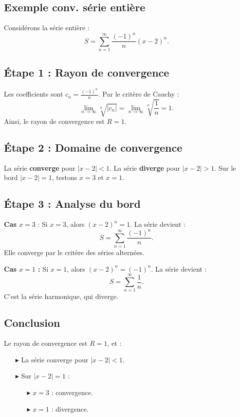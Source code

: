 \documentclass{report}
\begin{document}
\begin{multicols*}{3}
\section{Exemple  conv. série entière}

Considérons la série entière :
\[
S = \sum_{n=1}^\infty \frac{(-1)^n}{n} (x - 2)^n.
\]

\subsection*{Étape 1 : Rayon de convergence}
Les coefficients sont \(c_n = \frac{(-1)^n}{n}\). Par le critère de Cauchy :
\[
\lim_{n \to \infty} \sqrt[n]{|c_n|} = \lim_{n \to \infty} \sqrt[n]{\frac{1}{n}} = 1.
\]
Ainsi, le rayon de convergence est \(R = 1\).

\subsection*{Étape 2 : Domaine de convergence}
 La série \textbf{converge} pour \( |x - 2| < 1 \). 
 La série \textbf{diverge} pour \( |x - 2| > 1 \).
Sur le bord \( |x - 2| = 1 \), testons \(x = 3\) et \(x = 1\).

\subsection*{Étape 3 : Analyse du bord}
\textbf{Cas \(x = 3\) } :
Si \(x = 3\), alors \((x - 2)^n = 1\). La série devient :
\[
S = \sum_{n=1}^\infty \frac{(-1)^n}{n}.
\]
Elle converge par le critère des séries alternées.

\textbf{Cas \(x = 1\) :}
Si \(x = 1\), alors \((x - 2)^n = (-1)^n\). La série devient :
\[
S = \sum_{n=1}^\infty \frac{1}{n}.
\]
C'est la série harmonique, qui diverge.

\subsection*{Conclusion}
Le rayon de convergence est \(R = 1\), et :
\begin{itemize}
    \item [$\blacktriangleright$ ] La série converge pour \( |x - 2| < 1 \).
    \item [$\blacktriangleright$ ] Sur \( |x - 2| = 1 \) :
    \begin{itemize}
        \item [$\blacktriangleright$ ]  \(x = 3\) : convergence.
        \item [$\blacktriangleright$ ] \(x = 1\) : divergence.
    \end{itemize}
\end{itemize}
    \vspace{-1.5em}



\end{multicols*}
\end{document}
